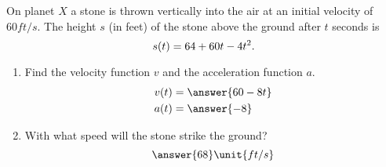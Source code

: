 \documentclass{ximera}
\begin{document}
\begin{exercise}
On planet $X$ a stone is thrown vertically into the air at an initial velocity of $60\unit{ft/s}$. The height $s$ (in feet) of the stone above the ground after $t$ seconds is
\[
s(t)=64+60t-4t^2\ldotp
\]
\begin{enumerate}[label=\bf{(\alph*)},align=left]
\item Find the velocity function $v$ and the acceleration function $a$. 
\begin{align*}
v(t)&=\answer{60-8t}\\
a(t)&=\answer{-8}
\end{align*}
\item With what speed will the stone strike the ground? \[\answer{68}\unit{ft/s}\] %
\end{enumerate}





\end{exercise}
\end{document}
